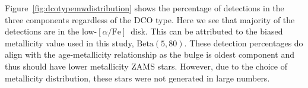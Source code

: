 \documentclass[journal, twocolumn]{IEEEtran}
\newcommand{\lowalpha}{low-$[\alpha/\text{Fe}]$}
\newcommand{\ecc}[1]{e_\text{#1}}
\begin{document}
    Figure~\ref{fig:dcotypemwdistribution} shows the percentage of detections in the three components regardless of the DCO type.
    Here we see that majority of the detections are in the \lowalpha\ disk.
    This can be attributed to the biased metallicity value used in this study, $\text{Beta}(5, 80)$.
    These detection percentages do align with the age-metallicity relationship as the bulge is oldest component and thus should have lower metallicity ZAMS stars.
    However, due to the choice of metallicity distribution, these stars were not generated in large numbers.





%
\end{document}
